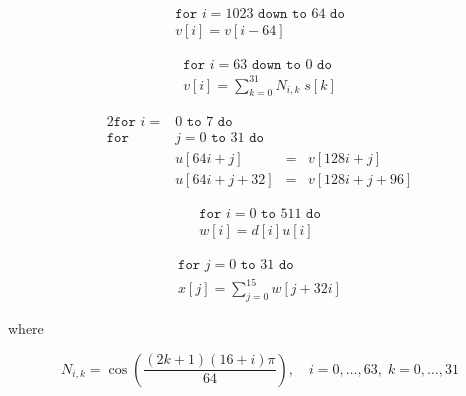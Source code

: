 \documentclass{article} %
\begin{document}
\begin{align}
\label{eq:vshift}
\texttt{for } i=1023 \texttt{ down to } 64 \texttt{ do}\nonumber \\
v[i]=v[i-64]
\end{align}

\begin{align}
\label{eq:Nisk}
\texttt{for } i=63 \texttt{ down to } 0 \texttt{ do} \nonumber \\
v[i]=\sum\limits_{k=0}^{31} N_{i,k} \; s[k]
\end{align}

\begin{alignat}{2}
\texttt{for } i=&0 \texttt{ to } 7 \texttt{ do} \nonumber \\
\texttt{for } &j=0 \texttt{ to } 31 \texttt{ do} \nonumber \\
& u[64i+j] &=&v[128i+j] \label{eq:ushift1}\\
& u[64i+j+32] &= &v[128i+j+96]\label{eq:ushift2} 
\end{alignat}


\begin{align}
\texttt{for } i=0 \texttt{ to } 511 \texttt{ do} \nonumber \\
w[i]=d[i] u[i] \label{eq:wi}
\end{align}

\begin{align}
\texttt{for } j=0 \texttt{ to } 31 \texttt{ do} \nonumber \\
x[j]=\sum\limits_{j=0}^{15} w[j+32i] \label{eq:xj}
\end{align}

where

\begin{equation}
\label{eq:nik}
\boxed{
N_{i,k}=\cos \left( \frac{(2k+1)(16+i)\pi}{64}\right), 
\quad i=0,\dots,63, \; k=0,\dots,31
}
\end{equation}

% 
\end{document}
